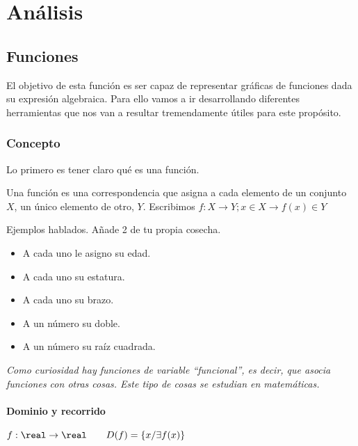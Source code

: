 
\chapter{Análisis}


\section{Funciones}

El objetivo de esta función es ser capaz de representar gráficas de funciones dada su expresión algebraica. 
%
Para ello vamos a ir desarrollando diferentes herramientas que nos van a resultar tremendamente útiles para este propósito.

\subsection{Concepto}

Lo primero es tener claro qué es una función.

\begin{defn}[Función]
Una función es una correspondencia que asigna a cada elemento de un conjunto $X$, un único elemento de otro, $Y$. Escribimos $f: X \to Y; x\in X\to f(x)\in Y$
\end{defn}

Ejemplos hablados. Añade 2 de tu propia cosecha.
\begin{itemize}
	\item A cada uno le asigno su edad.
	\item A cada uno su estatura.
	\item A cada uno su brazo.
	\item A un número su doble.
	\item A un número su raíz cuadrada.
\end{itemize}

\textit{Como curiosidad hay funciones de variable ``funcional'', es decir, que asocia funciones con otras cosas. Este tipo de cosas se estudian en matemáticas.}


\subsubsection{Dominio y recorrido} 

\begin{defn}[Dominio]
$f:\real\to\real\quad\quad D(f) = \{x / \exists f(x)\}$
\end{defn}

